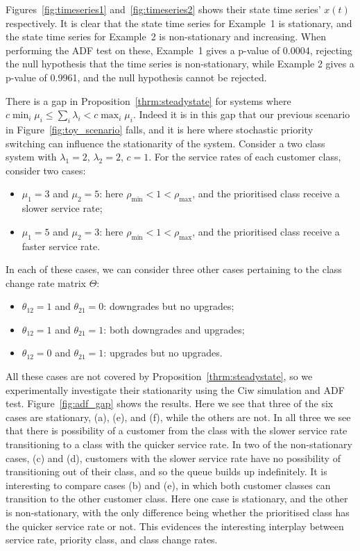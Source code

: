 \documentclass{article}
\begin{document}
Figures~\ref{fig:timeseries1} and~\ref{fig:timeseries2} shows their state time
series' $x(t)$ respectively. It is clear that the state time series for
Example~1 is stationary, and the state time series for Example~2 is
non-stationary and increasing. When performing the ADF test on these, Example~1
gives a p-value of 0.0004, rejecting the null hypothesis that the time series is
non-stationary, while Example 2 gives a p-value of 0.9961, and the null
hypothesis cannot be rejected.

There is a gap in Proposition~\ref{thrm:steadystate} for systems where
$c \min_i \mu_i \leq \sum_i \lambda_i < c \max_i \mu_i$. Indeed it is in this
gap that our previous scenario in Figure~\ref{fig:toy_scenario} falls, and it is
here where stochastic priority switching can influence the stationarity of the
system. Consider a two class system with $\lambda_1 = 2$, $\lambda_2 = 2$,
$c = 1$. For the service rates of each customer class, consider two cases:

\begin{itemize}
  \item $\mu_1 = 3$ and $\mu_2 = 5$: here
  $\rho_{\text{min}} < 1 < \rho_{\text{max}}$, and the prioritised class receive
  a slower service rate;
  \item $\mu_1 = 5$ and $\mu_2 = 3$: here
  $\rho_{\text{min}} < 1 < \rho_{\text{max}}$, and the prioritised class receive
  a faster service rate.
\end{itemize}

In each of these cases, we can consider three other cases pertaining to the
class change rate matrix $\Theta$:

\begin{itemize}
  \item $\theta_{12} = 1$ and $\theta_{21} = 0$: downgrades but no upgrades;
  \item $\theta_{12} = 1$ and $\theta_{21} = 1$: both downgrades and upgrades;
  \item $\theta_{12} = 0$ and $\theta_{21} = 1$: upgrades but no upgrades.
\end{itemize}

All these cases are not covered by Proposition~\ref{thrm:steadystate}, so we
experimentally investigate their stationarity using the Ciw simulation and ADF
test. Figure~\ref{fig:adf_gap} shows the results. Here we see that three of the
six cases are stationary, (a), (e), and (f), while the others are not. In all
three we see that there is possibility of a customer from the class with the
slower service rate transitioning to a class with the quicker service rate. In
two of the non-stationary cases, (c) and (d), customers with the slower service
rate have no possibility of transitioning out of their class, and so the queue
builds up indefinitely.
It is interesting to compare cases (b) and (e), in which both customer classes
can transition to the other customer class. Here one case is stationary, and the
other is non-stationary, with the only difference being whether the prioritised
class has the quicker service rate or not. This evidences the interesting
interplay between service rate, priority class, and class change rates.
\end{document}
